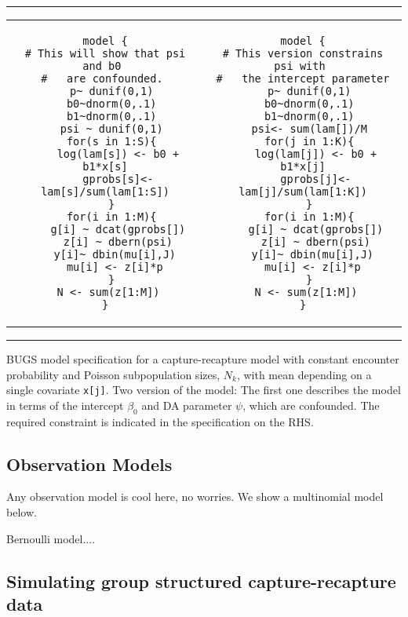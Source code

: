 \begin{panel}[htp]   
\renewcommand{\baselinestretch}{1.0}
\centering
\rule[0.15in]{\textwidth}{.03in}
\begin{tabular}{cc}
\begin{minipage}{3.25in}
{\small
\begin{verbatim}
model {
# This will show that psi and b0 
#   are confounded. 
  p~ dunif(0,1)
  b0~dnorm(0,.1)
  b1~dnorm(0,.1)
  psi ~ dunif(0,1)
  for(s in 1:S){
    log(lam[s]) <- b0 + b1*x[s]
    gprobs[s]<- lam[s]/sum(lam[1:S])
  }
  for(i in 1:M){
    g[i] ~ dcat(gprobs[])
    z[i] ~ dbern(psi)
   y[i]~ dbin(mu[i],J)
   mu[i] <- z[i]*p
  }
  N <- sum(z[1:M]) 
}
\end{verbatim}
}
\end{minipage}
&
\begin{minipage}{3.25in}
{\small
\begin{verbatim}
model {
# This version constrains psi with 
#   the intercept parameter
  p~ dunif(0,1)
  b0~dnorm(0,.1)
  b1~dnorm(0,.1)
  psi<- sum(lam[])/M
  for(j in 1:K){
    log(lam[j]) <- b0 + b1*x[j]
    gprobs[j]<- lam[j]/sum(lam[1:K])
  }
  for(i in 1:M){
    g[i] ~ dcat(gprobs[])
    z[i] ~ dbern(psi)
   y[i]~ dbin(mu[i],J)
   mu[i] <- z[i]*p
  }
  N <- sum(z[1:M]) 
}
\end{verbatim}
}
\end{minipage}
\end{tabular}
\rule[-0.15in]{\textwidth}{.03in}
\caption{BUGS model specification for a capture-recapture model with
  constant encounter probability and Poisson subpopulation sizes,
  $N_{k}$, with mean depending on a single covariate \mbox{\tt x[j]}. 
Two version of the model: The first one describes the model in terms
of the intercept $\beta_0$ and DA parameter $\psi$, which are
confounded. The required constraint is indicated in the specification
on the RHS. 
}
\label{panel.wbcode}
\end{panel}

\subsection{Observation Models}

Any observation model is cool here, no worries.
We show a multinomial model below.

Bernoulli model....



\subsection{Simulating group structured 
capture-recapture data}

